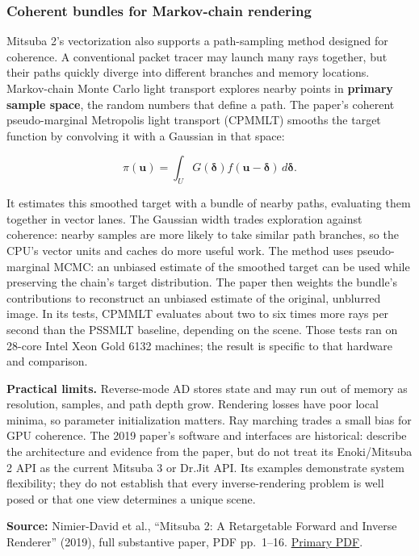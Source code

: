\subsubsection{Coherent bundles for Markov-chain rendering}\label{03-visual-computing-i-ch011-coherent-bundles-for-markov-chain-rendering}

Mitsuba 2's vectorization also supports a path-sampling method designed for coherence. A conventional packet tracer may launch many rays together, but their paths quickly diverge into different branches and memory locations. Markov-chain Monte Carlo light transport explores nearby points in \textbf{primary sample space}, the random numbers that define a path. The paper's coherent pseudo-marginal Metropolis light transport (CPMMLT) smooths the target function by convolving it with a Gaussian in that space:

\[\pi(\mathbf{u})=\int_U G(\boldsymbol\delta)f(\mathbf{u}-\boldsymbol\delta)\,d\boldsymbol\delta.\]

It estimates this smoothed target with a bundle of nearby paths, evaluating them together in vector lanes. The Gaussian width trades exploration against coherence: nearby samples are more likely to take similar path branches, so the CPU's vector units and caches do more useful work. The method uses pseudo-marginal MCMC: an unbiased estimate of the smoothed target can be used while preserving the chain's target distribution. The paper then weights the bundle's contributions to reconstruct an unbiased estimate of the original, unblurred image. In its tests, CPMMLT evaluates about two to six times more rays per second than the PSSMLT baseline, depending on the scene. Those tests ran on 28-core Intel Xeon Gold 6132 machines; the result is specific to that hardware and comparison.

\textbf{Practical limits.} Reverse-mode AD stores state and may run out of memory as resolution, samples, and path depth grow. Rendering losses have poor local minima, so parameter initialization matters. Ray marching trades a small bias for GPU coherence. The 2019 paper's software and interfaces are historical: describe the architecture and evidence from the paper, but do not treat its Enoki/Mitsuba 2 API as the current Mitsuba 3 or Dr.Jit API. Its examples demonstrate system flexibility; they do not establish that every inverse-rendering problem is well posed or that one view determines a unique scene.

\textbf{Source:} Nimier-David et al., ``Mitsuba 2: A Retargetable Forward and Inverse Renderer'' (2019), full substantive paper, PDF pp.~1--16. \href{https://rgl.s3.eu-central-1.amazonaws.com/media/papers/NimierDavidVicini2019Mitsuba2_7.pdf}{Primary PDF}.

